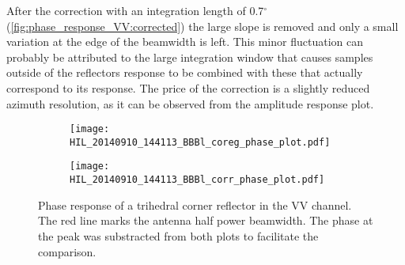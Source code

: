 After the correction with an integration length of 0.7$^\circ$  (\autoref{fig:phase_response_VV:corrected}) the large slope is removed and only a small variation at the edge of the beamwidth is left. This minor fluctuation can probably be attributed to the large integration window that causes samples outside of the reflectors response to be combined with these that actually correspond to its response. The price of the correction is a slightly reduced azimuth resolution, as it can be observed from the amplitude response plot.
\begin{figure}[ht]
	\centering
	\begin{subfigure}[b]{\columnwidth}
		\centering
		\texttt{[image: HIL\_20140910\_144113\_BBBl\_coreg\_phase\_plot.pdf]}
		\label{fig:phase_response_VV:uncorrected}
	\end{subfigure}
	\begin{subfigure}[b]{\columnwidth}
		\centering
		\texttt{[image: HIL\_20140910\_144113\_BBBl\_corr\_phase\_plot.pdf]}
		\label{fig:phase_response_VV:corrected}
	\end{subfigure}
	\caption{Phase response of a trihedral corner reflector in the VV channel. The red line marks the antenna half power beamwidth. The phase at the peak was substracted from both plots to facilitate the comparison.}\label{fig:phase_response_VV}
\end{figure}
\FloatBarrier
